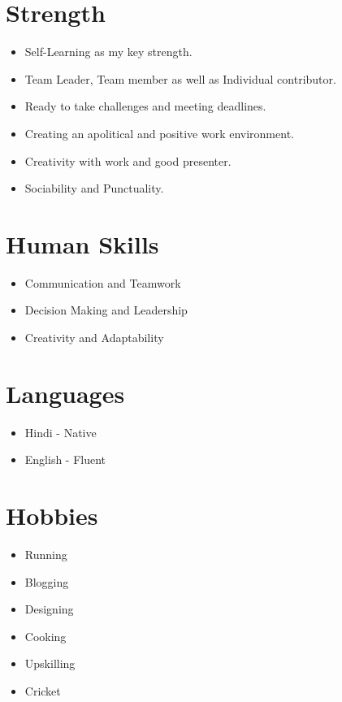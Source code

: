 \documentclass[11pt, a4paper]{article}
\begin{document}
\section*{Strength}
\vspace{-1.5mm}
\begin{itemize}[noitemsep, nolistsep]
\item[\scriptsize\faArrowRight] Self-Learning as my key strength.
\item[\scriptsize\faArrowRight] Team Leader, Team member as well as Individual contributor.
\item[\scriptsize\faArrowRight] Ready to take challenges and meeting deadlines.
\item[\scriptsize\faArrowRight] Creating an apolitical and positive work environment.
\item[\scriptsize\faArrowRight] Creativity with work and good presenter.
\item[\scriptsize\faArrowRight] Sociability and Punctuality.
\end{itemize}

\section*{Human Skills}
\vspace{-1.5mm}
\begin{itemize}[noitemsep, nolistsep]
\item[\scriptsize\faPlay] Communication and Teamwork
\item[\scriptsize\faPlay] Decision Making and Leadership
\item[\scriptsize\faPlay] Creativity and Adaptability
\end{itemize}

\section*{Languages}
\vspace{-1.5mm}
\begin{itemize}[noitemsep, nolistsep]
\item[\scriptsize\faLanguage] Hindi - Native
\item[\scriptsize\faLanguage] English - Fluent
\end{itemize}

\section*{Hobbies}
\vspace{-1.5mm}
\begin{itemize}[noitemsep, nolistsep]
\item[\scriptsize\faStar] Running
\item[\scriptsize\faStar] Blogging
\item[\scriptsize\faStar] Designing
\item[\scriptsize\faStar] Cooking
\item[\scriptsize\faStar] Upskilling
\item[\scriptsize\faStar] Cricket
\end{itemize}
\end{document}
